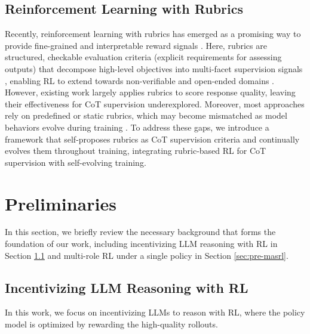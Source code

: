 \subsection{Reinforcement Learning with Rubrics}
Recently, reinforcement learning with rubrics has emerged as a promising way to provide fine-grained and interpretable reward signals \cite{Rubicon, Rubrics-as-Rewards, HealthBench, Chasing-the-Tail}.
Here, rubrics are structured, checkable evaluation criteria (\ie explicit requirements for assessing outputs) \cite{Rubrics-as-Rewards} that decompose high-level objectives into multi-facet supervision signals \cite{DR-Tulu}, enabling RL to extend towards non-verifiable and open-ended domains \cite{RuscaRL, Rubrics-as-Rewards}.
However, existing work largely applies rubrics to score response quality, leaving their effectiveness for CoT supervision underexplored.
Moreover, most approaches rely on predefined or static rubrics, which may become mismatched as model behaviors evolve during training \cite{DR-Tulu}.
To address these gaps, we introduce a framework that self-proposes rubrics as CoT supervision criteria and continually evolves them throughout training, integrating rubric-based RL for CoT supervision with self-evolving training.


\section{Preliminaries}
In this section, we briefly review the necessary background that forms the foundation of our work, including incentivizing LLM reasoning with RL in Section \ref{sec:pre-training} and multi-role RL under a single policy in Section \ref{sec:pre-masrl}. 

    \subsection{Incentivizing LLM Reasoning with RL} \label{sec:pre-training}
In this work, we focus on incentivizing LLMs to reason with RL, where the policy model is optimized by rewarding the high-quality rollouts.

